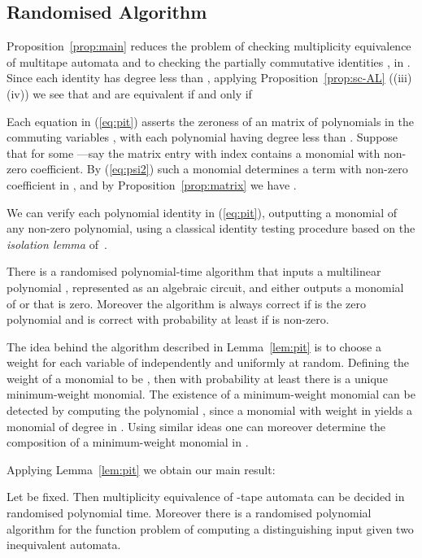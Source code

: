 \documentclass[runningheads]{llncs}
\begin{document}
\subsection{Randomised Algorithm}

Proposition~\ref{prop:main} reduces the problem of checking
multiplicity equivalence of multitape automata  and  to checking
the partially commutative identities ,  in .  Since
each identity has degree less than , applying
Proposition~\ref{prop:sc-AL} ((iii)  (iv)) we see
that  and  are equivalent if and only if


Each equation  in (\ref{eq:pit})
asserts the zeroness of an  matrix of polynomials in
the commuting variables , with each polynomial having degree
less than .  Suppose that 
for some ---say the matrix entry with index
 contains a monomial with non-zero
coefficient.  By (\ref{eq:psi2}) such a monomial determines a term  with non-zero
coefficient in , and by
Proposition~\ref{prop:matrix} we have .

We can verify each polynomial identity in (\ref{eq:pit}), outputting a
monomial of any non-zero polynomial, using a classical identity testing
procedure based on the \emph{isolation lemma} of~\cite{MVV87}.

\begin{lemma}
  There is a randomised polynomial-time algorithm that inputs a
  multilinear polynomial , represented as an
  algebraic circuit, and either outputs a monomial of  or that 
  is zero.  Moreover the algorithm is always correct if  is the
  zero polynomial and is correct with probability at least  if
   is non-zero.
\label{lem:pit}
\end{lemma}

The idea behind the algorithm described in Lemma~\ref{lem:pit} is to
choose a weight  for each variable  of
 independently and uniformly at random.  Defining the weight of a
monomial  to be , then
with probability at least  there is a unique minimum-weight
monomial.  The existence of a minimum-weight monomial can be detected
by computing the polynomial , since a
monomial with weight  in  yields a monomial of degree  in
.  Using similar ideas one can moreover determine the composition of
a minimum-weight monomial in .

Applying Lemma~\ref{lem:pit} we obtain our main result:
\begin{theorem}
Let  be fixed.  Then multiplicity equivalence of -tape automata can
be decided in randomised polynomial time.  Moreover there is a
randomised polynomial algorithm for the function problem of computing
a distinguishing input given two inequivalent automata.
\label{thm:main}
\end{theorem}
\end{document}
